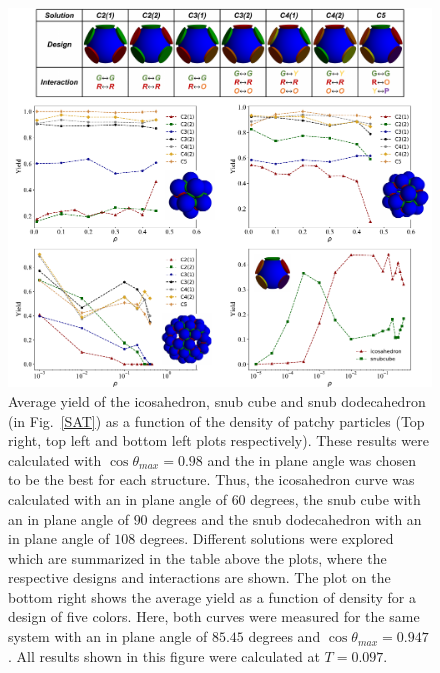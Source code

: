 \documentclass[a4paper, amsfonts, amssymb, amsmath, reprint, showkeys, nofootinbib, twoside]{revtex4-1}
\begin{document}
\begin{figure}[t]
	\includegraphics{fig4.pdf}
	\caption{\label{Yield} Average yield of the icosahedron, snub cube and snub dodecahedron (in Fig.~\ref{SAT}) as a function of the density of patchy particles (Top right, top left and bottom left plots respectively). These results were calculated with $\cos\theta_{max}=0.98$ and the in plane angle was chosen to be the best for each structure. Thus, the icosahedron curve was calculated with an in plane angle of $60$ degrees, the snub cube with an in plane angle of $90$ degrees and the snub dodecahedron with an in plane angle of $108$ degrees. Different solutions were explored which are summarized in the table above the plots, where the respective designs and interactions are shown. The plot on the bottom right shows the average yield as a function of density for a design of five colors. Here, both curves were measured for the same system with an in plane angle of $85.45$ degrees and $\cos\theta_{max}=0.947$. All results shown in this figure were calculated at $T=0.097$.}
\end{figure}
\end{document}
